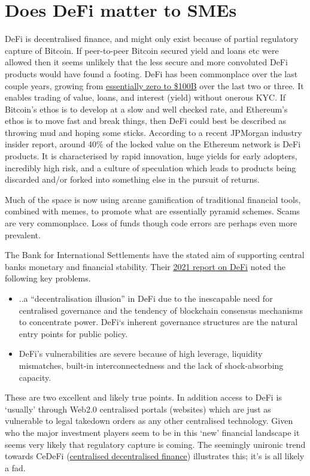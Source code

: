 \section{Does DeFi matter to SMEs }
DeFi is decentralised finance, and might only exist because of partial regulatory capture of Bitcoin. If peer-to-peer Bitcoin secured yield and loans etc were allowed then it seems unlikely that the less secure and more convoluted DeFi products would have found a footing. DeFi  has been commonplace over the last couple years, growing from \href{https://a16zcrypto.com/state-of-crypto-report-a16z-2022/}{essentially zero to \$100B} over the last two or three. It enables trading of value, loans, and interest (yield) without onerous KYC. If Bitcoin's ethos is to develop at a slow and well checked rate, and Ethereum's ethos is to move fast and break things, then DeFi could best be described as throwing mud and hoping some sticks. According to a recent JPMorgan industry insider report, around 40\% of the locked value on the Ethereum network is DeFi products. It is characterised by rapid innovation, huge yields for early adopters, incredibly high risk, and a culture of speculation which leads to products being discarded and/or forked into something else in the pursuit of returns.\par 
Much of the space is now using arcane gamification of traditional financial tools, combined with memes, to promote what are essentially pyramid schemes. Scams are very commonplace. Loss of funds though code errors are perhaps even more prevalent.\par
The Bank for International Settlements have the stated aim of supporting central banks monetary and financial stability. Their \href{https://www.bis.org/publ/qtrpdf/r_qt2112b.pdf}{2021 report on DeFi} noted the following key problems.
\begin{itemize}
\item ..a ``decentralisation illusion'' in DeFi due to the inescapable need for centralised governance and the tendency of blockchain consensus mechanisms to concentrate power. DeFi`s inherent governance structures are the natural entry points for public policy.
\item DeFi’s vulnerabilities are severe because of high leverage, liquidity mismatches, built-in interconnectedness and the lack of shock-absorbing capacity.
\end{itemize}
These are two excellent and likely true points. In addition access to DeFi is `usually' through Web2.0 centralised portals (websites) which are just as vulnerable to legal takedown orders as any other centralised technology. Given who the major investment players seem to be in this `new' financial landscape it seems very likely that regulatory capture is coming. The seemingly unironic trend towards CeDeFi (\href{https://www.nasdaq.com/articles/cedefi-what-it-is-and-why-it-matters}{centralised decentralised finance}) illustrates this; it's is all likely a fad.\par
